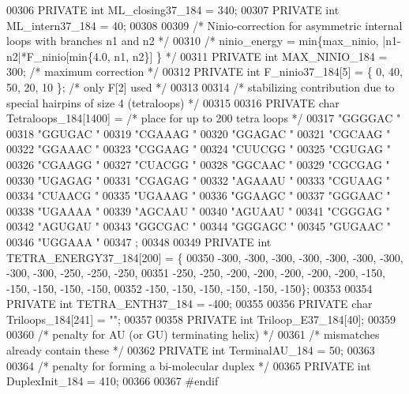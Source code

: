 \begin{DoxyCode}
00306 PRIVATE \textcolor{keywordtype}{int} ML\_closing37\_184 = 340;
00307 PRIVATE \textcolor{keywordtype}{int} ML\_intern37\_184 =  40;
00308 
00309 \textcolor{comment}{/* Ninio-correction for asymmetric internal loops with branches n1 and n2 */}
00310 \textcolor{comment}{/*    ninio\_energy = min\{max\_ninio, |n1-n2|*F\_ninio[min\{4.0, n1, n2\}] \} */}
00311 PRIVATE \textcolor{keywordtype}{int} MAX\_NINIO\_184 = 300;                   \textcolor{comment}{/* maximum correction */}
00312 PRIVATE \textcolor{keywordtype}{int} F\_ninio37\_184[5] = \{ 0, 40, 50, 20, 10 \};      \textcolor{comment}{/* only F[2] used */}
00313 
00314 \textcolor{comment}{/* stabilizing contribution due to special hairpins of size 4 (tetraloops) */}
00315 
00316 PRIVATE \textcolor{keywordtype}{char} Tetraloops\_184[1400] =  \textcolor{comment}{/* place for up to 200 tetra loops */}
00317   \textcolor{stringliteral}{"GGGGAC "}
00318   \textcolor{stringliteral}{"GGUGAC "}
00319   \textcolor{stringliteral}{"CGAAAG "}
00320   \textcolor{stringliteral}{"GGAGAC "}
00321   \textcolor{stringliteral}{"CGCAAG "}
00322   \textcolor{stringliteral}{"GGAAAC "}
00323   \textcolor{stringliteral}{"CGGAAG "}
00324   \textcolor{stringliteral}{"CUUCGG "}
00325   \textcolor{stringliteral}{"CGUGAG "}
00326   \textcolor{stringliteral}{"CGAAGG "}
00327   \textcolor{stringliteral}{"CUACGG "}
00328   \textcolor{stringliteral}{"GGCAAC "}
00329   \textcolor{stringliteral}{"CGCGAG "}
00330   \textcolor{stringliteral}{"UGAGAG "}
00331   \textcolor{stringliteral}{"CGAGAG "}
00332   \textcolor{stringliteral}{"AGAAAU "}
00333   \textcolor{stringliteral}{"CGUAAG "}
00334   \textcolor{stringliteral}{"CUAACG "}
00335   \textcolor{stringliteral}{"UGAAAG "}
00336   \textcolor{stringliteral}{"GGAAGC "}
00337   \textcolor{stringliteral}{"GGGAAC "}
00338   \textcolor{stringliteral}{"UGAAAA "}
00339   \textcolor{stringliteral}{"AGCAAU "}
00340   \textcolor{stringliteral}{"AGUAAU "}
00341   \textcolor{stringliteral}{"CGGGAG "}
00342   \textcolor{stringliteral}{"AGUGAU "}
00343   \textcolor{stringliteral}{"GGCGAC "}
00344   \textcolor{stringliteral}{"GGGAGC "}
00345   \textcolor{stringliteral}{"GUGAAC "}
00346   \textcolor{stringliteral}{"UGGAAA "}
00347 ;
00348 
00349 PRIVATE \textcolor{keywordtype}{int}   TETRA\_ENERGY37\_184[200] = \{
00350   -300, -300, -300, -300, -300, -300, -300, -300, -300, -250, -250, -250,
00351   -250, -250, -200, -200, -200, -200, -200, -150, -150, -150, -150, -150,
00352   -150, -150, -150, -150, -150, -150\};
00353 
00354 PRIVATE \textcolor{keywordtype}{int}   TETRA\_ENTH37\_184   = -400;
00355 
00356 PRIVATE \textcolor{keywordtype}{char} Triloops\_184[241] = \textcolor{stringliteral}{""};
00357 
00358 PRIVATE \textcolor{keywordtype}{int} Triloop\_E37\_184[40];
00359 
00360 \textcolor{comment}{/* penalty for AU (or GU) terminating helix) */}
00361 \textcolor{comment}{/* mismatches already contain these */}
00362 PRIVATE \textcolor{keywordtype}{int} TerminalAU\_184 = 50;
00363 
00364 \textcolor{comment}{/* penalty for forming a bi-molecular duplex */}
00365 PRIVATE \textcolor{keywordtype}{int} DuplexInit\_184 = 410;
00366 
00367 \textcolor{preprocessor}{#endif}
\end{DoxyCode}
